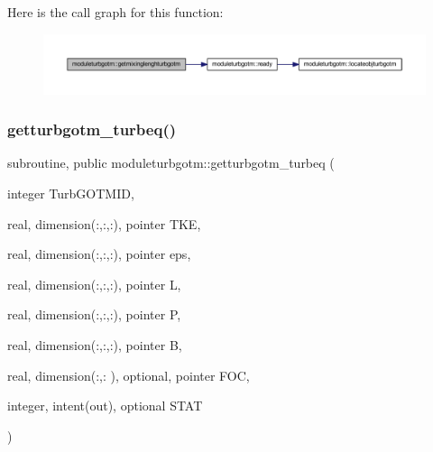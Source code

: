 Here is the call graph for this function\+:\nopagebreak
\begin{figure}[H]
\begin{center}
\leavevmode
\includegraphics[width=350pt]{namespacemoduleturbgotm_a6d3261fc0b6cba6819262e7f8ce2b140_cgraph}
\end{center}
\end{figure}
\mbox{\label{namespacemoduleturbgotm_a087db16b86a3a5c9670ca783b6075e65}} 
\subsubsection{\texorpdfstring{getturbgotm\+\_\+turbeq()}{getturbgotm\_turbeq()}}
{\footnotesize\ttfamily subroutine, public moduleturbgotm\+::getturbgotm\+\_\+turbeq (\begin{DoxyParamCaption}\item[{integer}]{Turb\+G\+O\+T\+M\+ID,  }\item[{real, dimension(\+:,\+:,\+:), pointer}]{T\+KE,  }\item[{real, dimension(\+:,\+:,\+:), pointer}]{eps,  }\item[{real, dimension(\+:,\+:,\+:), pointer}]{L,  }\item[{real, dimension(\+:,\+:,\+:), pointer}]{P,  }\item[{real, dimension(\+:,\+:,\+:), pointer}]{B,  }\item[{real, dimension(\+:,\+:  ), optional, pointer}]{F\+OC,  }\item[{integer, intent(out), optional}]{S\+T\+AT }\end{DoxyParamCaption})}

